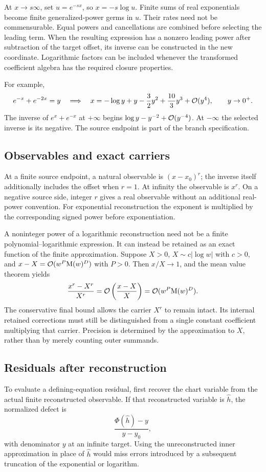 At $x\to s\infty$, set $u=e^{-s x}$, so $x=-s\log u$. Finite sums
of real exponentials become finite generalized-power germs in $u$. Their
rates need not be commensurable. Equal powers and cancellations are combined
before selecting the leading term. When the resulting expression has a
nonzero leading power after subtraction of the target offset, its inverse
can be constructed in the new coordinate. Logarithmic factors can be
included whenever the transformed coefficient algebra has the required
closure properties.

For example,
\[
 e^{-x}+e^{-2x}=y
 \quad\Longrightarrow\quad
 x=-\log y+y-\frac32y^2+\frac{10}3y^3+\mathcal O(y^4),
 \qquad y\to0^+.
\]
The inverse of $e^x+e^{-x}$ at $+\infty$ begins
$\log y-y^{-2}+\mathcal O(y^{-4})$. At $-\infty$ the selected inverse is its
negative. The source endpoint is part of the branch specification.

\subsection{Observables and exact carriers}

At a finite source endpoint, a natural observable is $(x-x_0)^r$;
the inverse itself additionally includes the offset when $r=1$.
At infinity the observable is $x^r$. On a negative source side, integer
$r$ gives a real observable without an additional real-power convention.
For exponential reconstruction the exponent is multiplied by the
corresponding signed power before exponentiation.

A noninteger power of a logarithmic reconstruction need not be a finite
polynomial--logarithmic expression. It can instead be retained as an exact
function of the finite approximation. Suppose $X>0$,
$X\sim c|\log w|$ with $c>0$, and
$x-X=\mathcal O(w^P\mathrm M(w)^D)$ with $P>0$. Then $x/X\to1$, and the mean
value theorem yields
\[
 \frac{x^r-X^r}{X^r}
 =\mathcal O\left(\frac{x-X}{X}\right)
 =\mathcal O(w^P\mathrm M(w)^D).
\]
The conservative final bound allows the carrier $X^r$ to remain intact.
Its internal retained corrections must still be distinguished from a single
constant coefficient multiplying that carrier. Precision is determined by
the approximation to $X$, rather than by merely counting outer summands.

\subsection{Residuals after reconstruction}

To evaluate a defining-equation residual, first recover the chart variable
from the actual finite reconstructed observable. If that reconstructed
variable is $\widehat h$, the normalized defect is
\[
 \frac{\Phi(\widehat h)-y}{y-y_0},
\]
with denominator $y$ at an infinite target. Using the unreconstructed inner
approximation in place of $\widehat h$ would miss errors introduced by a
subsequent truncation of the exponential or logarithm.

